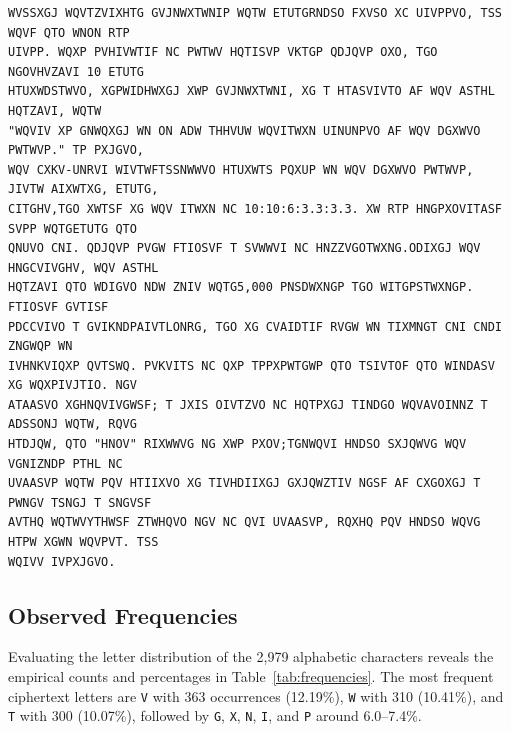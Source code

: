 \documentclass[11pt,a4paper]{article}
\begin{document}
\begin{lstlisting}[style=ciphertext,caption={Variant 20 intercepted ciphertext}]
WVSSXGJ WQVTZVIXHTG GVJNWXTWNIP WQTW ETUTGRNDSO FXVSO XC UIVPPVO, TSS WQVF QTO WNON RTP
UIVPP. WQXP PVHIVWTIF NC PWTWV HQTISVP VKTGP QDJQVP OXO, TGO NGOVHVZAVI 10 ETUTG
HTUXWDSTWVO, XGPWIDHWXGJ XWP GVJNWXTWNI, XG T HTASVIVTO AF WQV ASTHL HQTZAVI, WQTW
"WQVIV XP GNWQXGJ WN ON ADW THHVUW WQVITWXN UINUNPVO AF WQV DGXWVO PWTWVP." TP PXJGVO,
WQV CXKV-UNRVI WIVTWFTSSNWWVO HTUXWTS PQXUP WN WQV DGXWVO PWTWVP, JIVTW AIXWTXG, ETUTG,
CITGHV,TGO XWTSF XG WQV ITWXN NC 10:10:6:3.3:3.3. XW RTP HNGPXOVITASF SVPP WQTGETUTG QTO
QNUVO CNI. QDJQVP PVGW FTIOSVF T SVWWVI NC HNZZVGOTWXNG.ODIXGJ WQV HNGCVIVGHV, WQV ASTHL
HQTZAVI QTO WDIGVO NDW ZNIV WQTG5,000 PNSDWXNGP TGO WITGPSTWXNGP. FTIOSVF GVTISF
PDCCVIVO T GVIKNDPAIVTLONRG, TGO XG CVAIDTIF RVGW WN TIXMNGT CNI CNDI ZNGWQP WN
IVHNKVIQXP QVTSWQ. PVKVITS NC QXP TPPXPWTGWP QTO TSIVTOF QTO WINDASV XG WQXPIVJTIO. NGV
ATAASVO XGHNQVIVGWSF; T JXIS OIVTZVO NC HQTPXGJ TINDGO WQVAVOINNZ T ADSSONJ WQTW, RQVG
HTDJQW, QTO "HNOV" RIXWWVG NG XWP PXOV;TGNWQVI HNDSO SXJQWVG WQV VGNIZNDP PTHL NC
UVAASVP WQTW PQV HTIIXVO XG TIVHDIIXGJ GXJQWZTIV NGSF AF CXGOXGJ T PWNGV TSNGJ T SNGVSF
AVTHQ WQTWVYTHWSF ZTWHQVO NGV NC QVI UVAASVP, RQXHQ PQV HNDSO WQVG HTPW XGWN WQVPVT. TSS
WQIVV IVPXJGVO.
\end{lstlisting}

\subsection{Observed Frequencies}

Evaluating the letter distribution of the 2,979 alphabetic characters reveals the empirical counts and percentages in Table~\ref{tab:frequencies}. The most frequent ciphertext letters are \texttt{V} with 363 occurrences (12.19\%), \texttt{W} with 310 (10.41\%), and \texttt{T} with 300 (10.07\%), followed by \texttt{G}, \texttt{X}, \texttt{N}, \texttt{I}, and \texttt{P} around 6.0--7.4\%.
\end{document}
